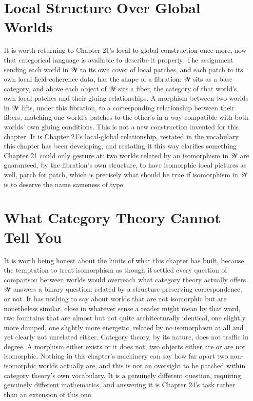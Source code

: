 \section{Local Structure Over Global Worlds}

It is worth returning to Chapter 21's local-to-global construction once more, now that categorical language is available to describe it properly. The assignment sending each world in 𝒲 to its own cover of local patches, and each patch to its own local field-coherence data, has the shape of a fibration: 𝒲 sits as a base category, and above each object of 𝒲 sits a fiber, the category of that world's own local patches and their gluing relationships. A morphism between two worlds in 𝒲 lifts, under this fibration, to a corresponding relationship between their fibers, matching one world's patches to the other's in a way compatible with both worlds' own gluing conditions. This is not a new construction invented for this chapter. It is Chapter 21's local-global relationship, restated in the vocabulary this chapter has been developing, and restating it this way clarifies something Chapter 21 could only gesture at: two worlds related by an isomorphism in 𝒲 are guaranteed, by the fibration's own structure, to have isomorphic local pictures as well, patch for patch, which is precisely what should be true if isomorphism in 𝒲 is to deserve the name sameness of type.

\section{What Category Theory Cannot Tell You}

It is worth being honest about the limits of what this chapter has built, because the temptation to treat isomorphism as though it settled every question of comparison between worlds would overreach what category theory actually offers. 𝒲 answers a binary question: related by a structure-preserving correspondence, or not. It has nothing to say about worlds that are not isomorphic but are nonetheless similar, close in whatever sense a reader might mean by that word, two fountains that are almost but not quite architecturally identical, one slightly more damped, one slightly more energetic, related by no isomorphism at all and yet clearly not unrelated either. Category theory, by its nature, does not traffic in degree. A morphism either exists or it does not; two objects either are or are not isomorphic. Nothing in this chapter's machinery can say how far apart two non-isomorphic worlds actually are, and this is not an oversight to be patched within category theory's own vocabulary. It is a genuinely different question, requiring genuinely different mathematics, and answering it is Chapter 24's task rather than an extension of this one.

